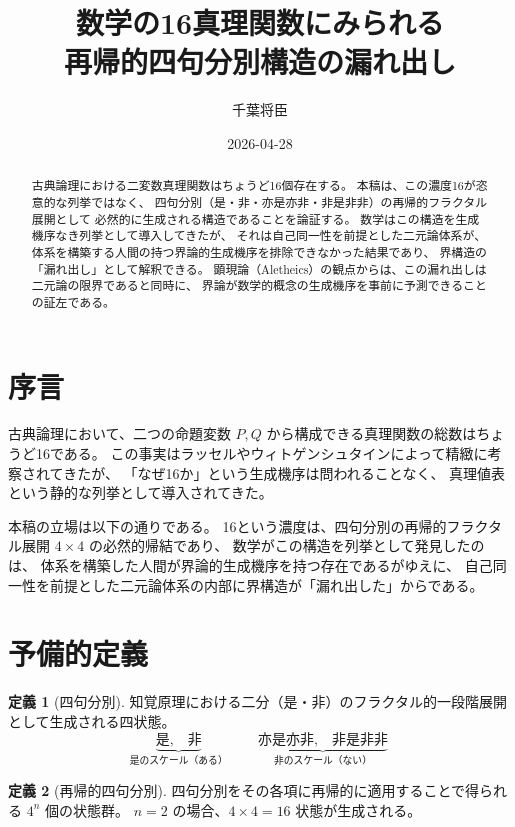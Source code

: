 \documentclass[11pt,a4paper]{article}
\theoremstyle{definition}
\newtheorem{definition}{定義}[section]
\begin{document}
\title{数学の16真理関数にみられる\\再帰的四句分別構造の漏れ出し}
\author{千葉将臣}
\date{2026-04-28}
\maketitle

\begin{abstract}
古典論理における二変数真理関数はちょうど16個存在する。
本稿は、この濃度16が恣意的な列挙ではなく、
四句分別（是・非・亦是亦非・非是非非）の再帰的フラクタル展開として
必然的に生成される構造であることを論証する。
数学はこの構造を生成機序なき列挙として導入してきたが、
それは自己同一性を前提とした二元論体系が、
体系を構築する人間の持つ界論的生成機序を排除できなかった結果であり、
界構造の「漏れ出し」として解釈できる。
顕現論（Aletheics）の観点からは、この漏れ出しは二元論の限界であると同時に、
界論が数学的概念の生成機序を事前に予測できることの証左である。
\end{abstract}

\section*{序言}

古典論理において、二つの命題変数 $P, Q$ から構成できる真理関数の総数はちょうど16である。
この事実はラッセルやウィトゲンシュタインによって精緻に考察されてきたが、
「なぜ16か」という生成機序は問われることなく、
真理値表という静的な列挙として導入されてきた。

本稿の立場は以下の通りである。
16という濃度は、四句分別の再帰的フラクタル展開 $4 \times 4$ の必然的帰結であり、
数学がこの構造を列挙として発見したのは、
体系を構築した人間が界論的生成機序を持つ存在であるがゆえに、
自己同一性を前提とした二元論体系の内部に界構造が「漏れ出した」からである。

\section{予備的定義}

\begin{definition}[四句分別]
知覚原理における二分（是・非）のフラクタル的一段階展開として生成される四状態。
\[
\underbrace{\text{是},\quad \text{非}}_{\text{是のスケール（ある）}}
\qquad
\underbrace{\text{亦是亦非},\quad \text{非是非非}}_{\text{非のスケール（ない）}}
\]
\end{definition}

\begin{definition}[再帰的四句分別]
四句分別をその各項に再帰的に適用することで得られる $4^n$ 個の状態群。
$n=2$ の場合、$4 \times 4 = 16$ 状態が生成される。
\end{definition}
\end{document}
